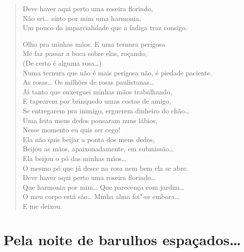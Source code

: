\begin{verse}
Deve haver aqui perto uma roseira florindo,\\
Não sei\ldots{} sinto por mim uma harmonia,\\
Um pouco da imparcialidade que a fadiga traz consigo.

Olho pra minhas mãos. E uma ternura perigosa\\
Me faz passar a boca sobre elas, roçando,\\
(De certo é alguma rosa\ldots{})\\
Numa ternura que não é mais perigosa não, é piedade paciente.\\
As rosas\ldots{} Os milhões de rosas paulistanas\ldots{}\\
Já tanto que enxerguei minhas mãos trabalhando,\\
E tapearem por brinquedo umas costas de amigo,\\
Se entregarem pra inimigo, erguerem dinheiro do chão\ldots{}\\
Uma feita meus dedos pousaram nuns lábios,\\
Nesse momento eu quis ser cego!\\
Ela não quis beijar a ponta dos meus dedos,\\
Beijou as mãos, apaixonadamente, em submissão\ldots{}\\
Ela beijou o pó das minhas mãos\ldots{}\\
O mesmo pó que já desce na rosa nem bem ela se abre.\\
Deve haver aqui perto uma roseira florindo\ldots{}\\
Que harmonia por mim\ldots{} Que parecença com jardim\ldots{}\\
O meu corpo está são\ldots{} Minha alma foi"-se embora\ldots{}\\
E me deixou.
\end{verse}

\chapter[Pela noite de barulhos espaçados\ldots{}]{Pela noite de barulhos espaçados\ldots{} }

